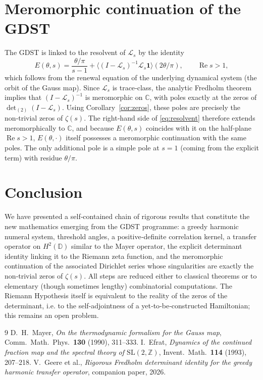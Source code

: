 \documentclass[12pt,a4paper]{article}
\theoremstyle{remark}
\begin{document}
\section{Meromorphic continuation of the GDST}
\label{sec:mero}

The GDST is linked to the resolvent of $\mathcal L_s$ by the identity
\begin{equation}\label{eq:resolvent}
E(\theta,s)=\frac{\theta/\pi}{s-1}+\bigl\langle (I-\mathcal L_s)^{-1}\mathcal L_s\mathbf1\bigr\rangle (2\theta/\pi),
\qquad\operatorname{Re}s>1,
\end{equation}
which follows from the renewal equation of the underlying dynamical system
(the orbit of the Gauss map).
Since $\mathcal L_s$ is trace‑class, the analytic Fredholm theorem implies that
$(I-\mathcal L_s)^{-1}$ is meromorphic on $\mathbb C$,
with poles exactly at the zeros of $\det_{(2)}(I-\mathcal L_s)$.
Using Corollary~\ref{cor:zeros}, these poles are precisely the non‑trivial zeros of $\zeta(s)$.
The right‑hand side of \eqref{eq:resolvent} therefore extends meromorphically to $\mathbb C$,
and because $E(\theta,s)$ coincides with it on the half‑plane $\operatorname{Re}s>1$,
$E(\theta,\cdot)$ itself possesses a meromorphic continuation with the same poles.
The only additional pole is a simple pole at $s=1$ (coming from the explicit term)
with residue $\theta/\pi$.

\section*{Conclusion}
We have presented a self‑contained chain of rigorous results that constitute the new mathematics emerging from the GDST programme:
a greedy harmonic numeral system, threshold angles, a positive‑definite correlation kernel,
a transfer operator on $H^2(\mathbb D)$ similar to the Mayer operator,
the explicit determinant identity linking it to the Riemann zeta function,
and the meromorphic continuation of the associated Dirichlet series whose singularities are exactly the non‑trivial zeros of $\zeta(s)$.
All steps are reduced either to classical theorems or to elementary (though sometimes lengthy) combinatorial computations.
The Riemann Hypothesis itself is equivalent to the reality of the zeros of the determinant,
i.e. to the self‑adjointness of a yet‑to‑be‑constructed Hamiltonian;
this remains an open problem.

\begin{thebibliography}{9}
D.~H.~Mayer,
\emph{On the thermodynamic formalism for the Gauss map},
Comm.~Math.~Phys.\ \textbf{130} (1990), 311--333.
I.~Efrat,
\emph{Dynamics of the continued fraction map and the spectral theory of $\mathrm{SL}(2,\mathbb Z)$},
Invent.~Math.\ \textbf{114} (1993), 207--218.
V.~Geere et al.,
\emph{Rigorous Fredholm determinant identity for the greedy harmonic transfer operator},
companion paper, 2026.
\end{thebibliography}
\end{document}
